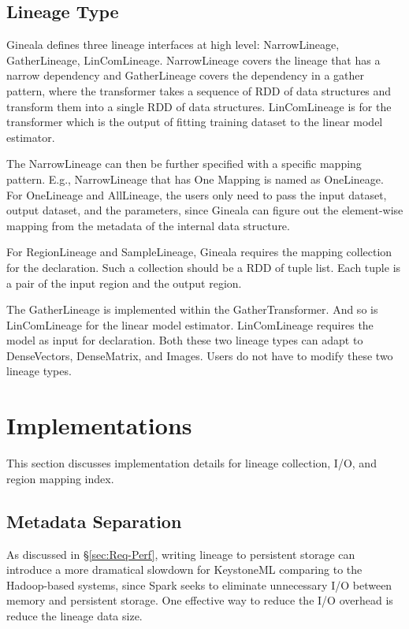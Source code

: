 \documentclass{sig-alternate}
\begin{document}
\subsection{Lineage Type}
Gineala defines three lineage interfaces at high level: NarrowLineage, GatherLineage, LinComLineage. 
NarrowLineage covers the lineage that has a narrow dependency and GatherLineage covers the dependency in a gather pattern, where the transformer takes a sequence of RDD of data structures and transform them into a single RDD of data structures. 
LinComLineage is for the transformer which is the output of fitting training dataset to the linear model estimator.

The NarrowLineage can then be further specified with a specific mapping pattern. E.g., NarrowLineage that has One Mapping is named as OneLineage.
For OneLineage and AllLineage, the users only need to pass the input dataset, output dataset, and the parameters, since Gineala can figure out the element-wise mapping from the metadata of the internal data structure.

For RegionLineage and SampleLineage, Gineala requires the mapping collection for the declaration. 
Such a collection should be a RDD of tuple list. 
Each tuple is a pair of the input region and the output region.

The GatherLineage is implemented within the GatherTransformer.
And so is LinComLineage for the linear model estimator. LinComLineage requires the model as input for declaration.
Both these two lineage types can adapt to DenseVectors, DenseMatrix, and Images. 
Users do not have to modify these two lineage types. 

\section{Implementations}
\label{sec:Impl}
This section discusses implementation details for lineage collection, I/O, and region mapping index.

\subsection{Metadata Separation}
As discussed in \S\ref{sec:Req-Perf}, writing lineage to persistent storage can introduce a more dramatical slowdown for KeystoneML comparing
to the Hadoop-based systems, since Spark seeks to eliminate unnecessary I/O between memory and persistent storage.
One effective way to reduce the I/O overhead is reduce the lineage data size.
\end{document}
